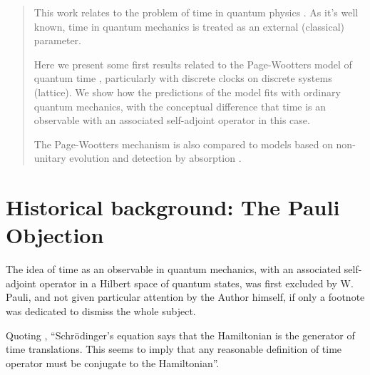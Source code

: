 \documentclass[a0,portrait]{a0poster}
\begin{document}
\begin{multicols}{2} %


\color{Navy} %

\begin{abstract}
\noindent %
This work relates to the problem of time in quantum physics \cite{TQM1, TQM2}.
As it's well known, time in quantum mechanics is treated as an external (classical) parameter.

Here we present some first results related to
the Page-Wootters model of quantum time \cite{Lloyd:Time, Maccone:Pauli},
particularly with discrete clocks on discrete systems (lattice).
We show how the predictions of the model fits with
ordinary quantum mechanics, with the conceptual difference that
time is an observable with an associated self-adjoint operator in this case.

The Page-Wootters mechanism is also compared to models based
on non-unitary evolution and detection by absorption \cite{RuschhauptAbsorption}.
\end{abstract}

\setlength{\parindent}{1.5em} %


\color{SaddleBrown} %

\section*{Historical background: The Pauli Objection}
The idea of time as an observable in quantum mechanics,
with an associated self-adjoint operator in a Hilbert space of quantum states,
was first excluded by W. Pauli,
and not given particular attention by the Author himself,
if only a footnote was dedicated to dismiss the whole subject. \cite{PauliFootnote}

Quoting \cite{Maccone:Pauli},
``Schr\"odinger's equation says that the Hamiltonian is the generator of time translations. This seems
to imply that any reasonable definition of time operator must be conjugate to the Hamiltonian''.


\end{multicols}
\end{document}
